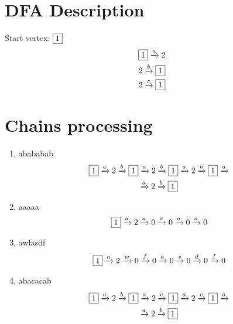 \documentclass[12pt]{article}
\begin{document}
 
\section* {DFA Description} 
Start vertex: $\fbox{1}$
\begin {equation*} 
\begin {gathered} 
\fbox{1} \xrightarrow{a} 2\\2 \xrightarrow{b} \fbox{1}\\2 \xrightarrow{c} \fbox{1}\\
\end {gathered} 
\end {equation*} 
\section* {Chains processing} 
\begin {enumerate} 
\item abababab
\begin {equation*} 
\begin {gathered} 
\fbox{1} \xrightarrow{a} 2 \xrightarrow{b} \fbox{1} \xrightarrow{a} 2 \xrightarrow{b} \fbox{1} \xrightarrow{a} 2 \xrightarrow{b} \fbox{1} \xrightarrow{a} \\
 \xrightarrow{a} 2 \xrightarrow{b} \fbox{1}
\end {gathered} 
\end {equation*} 

\item aaaaa
\begin {equation*} 
\begin {gathered} 
\fbox{1} \xrightarrow{a} 2 \xrightarrow{a} 0 \xrightarrow{a} 0 \xrightarrow{a} 0 \xrightarrow{a} 0
\end {gathered} 
\end {equation*} 

\item awfasdf
\begin {equation*} 
\begin {gathered} 
\fbox{1} \xrightarrow{a} 2 \xrightarrow{w} 0 \xrightarrow{f} 0 \xrightarrow{a} 0 \xrightarrow{s} 0 \xrightarrow{d} 0 \xrightarrow{f} 0
\end {gathered} 
\end {equation*} 

\item abacacab
\begin {equation*} 
\begin {gathered} 
\fbox{1} \xrightarrow{a} 2 \xrightarrow{b} \fbox{1} \xrightarrow{a} 2 \xrightarrow{c} \fbox{1} \xrightarrow{a} 2 \xrightarrow{c} \fbox{1} \xrightarrow{a} \\
 \xrightarrow{a} 2 \xrightarrow{b} \fbox{1}
\end {gathered} 
\end {equation*} 

\end {enumerate}
\end{document}
